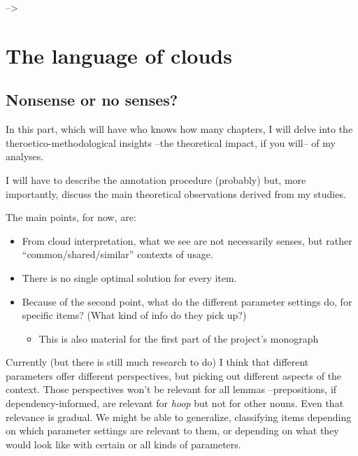 \documentclass[
]{book}
\providecommand{\tightlist}{%
  \setlength{\itemsep}{0pt}\setlength{\parskip}{0pt}}
\begin{document}
--\textgreater{}

\hypertarget{part-the-language-of-clouds}{%
\part{The language of clouds}\label{part-the-language-of-clouds}}

\hypertarget{nonsense-or-no-senses}{%
\chapter{Nonsense or no senses?}\label{nonsense-or-no-senses}}

In this part, which will have who knows how many chapters, I will delve into the
theroetico-methodological insights --the theoretical impact, if you will-- of
my analyses.

I will have to describe the annotation procedure (probably) but, more importantly,
discuss the main theoretical observations derived from my studies.

The main points, for now, are:

\begin{itemize}
\item
  From cloud interpretation, what we see are not necessarily senses, but rather
  ``common/shared/similar'' contexts of usage.
\item
  There is no single optimal solution for every item.
\item
  Because of the second point, what do the different parameter settings do,
  for specific items? (What kind of info do they pick up?)

  \begin{itemize}
  \tightlist
  \item
    This is also material for the first part of the project's monograph
  \end{itemize}
\end{itemize}

Currently (but there is still much research to do) I think that
different parameters offer different perspectives, but picking out different aspects
of the context.
Those perspectives won't be relevant for all lemmas --prepositions, if dependency-informed,
are relevant for \emph{hoop} but not for other nouns. Even that relevance is gradual.
We might be able to generalize, classifying items depending on which parameter settings
are relevant to them, or depending on what they would look like with certain or all kinds
of parameters.
\end{document}
